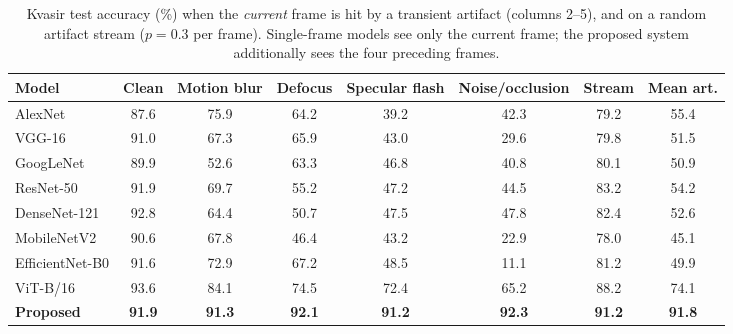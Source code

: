 \begin{table}[t]
\caption{Kvasir test accuracy (\%) when the \emph{current} frame is hit by a transient artifact (columns 2--5),
and on a random artifact stream ($p=0.3$ per frame). Single-frame models see only the current frame; the proposed
system additionally sees the four preceding frames.}
\label{tab:robust}\centering
\begin{tabular}{lccccccc}\toprule
Model & Clean & Motion blur & Defocus & Specular flash & Noise/occlusion & Stream & Mean art.\\\midrule
AlexNet & 87.6 & 75.9 & 64.2 & 39.2 & 42.3 & 79.2 & 55.4\\
VGG-16 & 91.0 & 67.3 & 65.9 & 43.0 & 29.6 & 79.8 & 51.5\\
GoogLeNet & 89.9 & 52.6 & 63.3 & 46.8 & 40.8 & 80.1 & 50.9\\
ResNet-50 & 91.9 & 69.7 & 55.2 & 47.2 & 44.5 & 83.2 & 54.2\\
DenseNet-121 & 92.8 & 64.4 & 50.7 & 47.5 & 47.8 & 82.4 & 52.6\\
MobileNetV2 & 90.6 & 67.8 & 46.4 & 43.2 & 22.9 & 78.0 & 45.1\\
EfficientNet-B0 & 91.6 & 72.9 & 67.2 & 48.5 & 11.1 & 81.2 & 49.9\\
ViT-B/16 & 93.6 & 84.1 & 74.5 & 72.4 & 65.2 & 88.2 & 74.1\\
\midrule\textbf{Proposed} & \textbf{91.9} & \textbf{91.3} & \textbf{92.1} & \textbf{91.2} & \textbf{92.3} & \textbf{91.2} & \textbf{91.8}\\
\bottomrule\end{tabular}\end{table}
